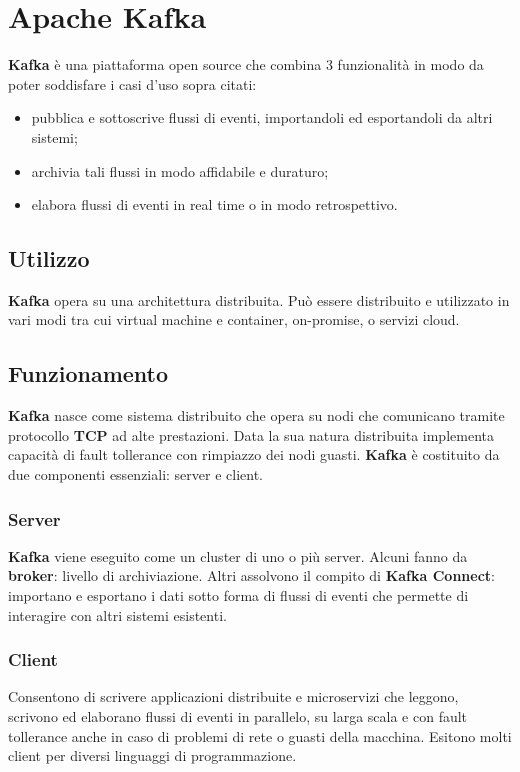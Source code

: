 \documentclass{article}
\begin{document}
\section{Apache \textbf{Kafka}}
\textbf{Kafka} è una piattaforma open source che combina 3 funzionalità in modo da poter soddisfare i casi d'uso sopra citati:
\begin{itemize}
    \item pubblica e sottoscrive flussi di eventi, importandoli ed 	esportandoli da altri sistemi;
    \item archivia tali flussi in modo affidabile e duraturo;	
    \item elabora flussi di eventi in real time o in modo retrospettivo.
\end{itemize}
\subsection{Utilizzo}
\textbf{Kafka} opera su una architettura distribuita. Può essere distribuito e utilizzato in vari modi tra cui virtual machine e container, on-promise, o servizi cloud.

\subsection{Funzionamento}
\textbf{Kafka} nasce come sistema distribuito che opera su nodi che comunicano tramite protocollo \textbf{TCP} ad alte prestazioni. Data la sua natura distribuita implementa capacità di fault tollerance con rimpiazzo dei nodi guasti. 
\textbf{Kafka} è costituito da due componenti essenziali: server e client.
\subsubsection{Server}
\textbf{Kafka} viene eseguito come un cluster di uno o più server. Alcuni fanno da \textbf{broker}: livello di archiviazione. Altri assolvono il compito di \textbf{\textbf{Kafka} Connect}: importano e esportano i dati sotto forma di  flussi di eventi che permette di interagire con altri sistemi esistenti.
\subsubsection{Client}
Consentono di scrivere applicazioni distribuite e microservizi che leggono, scrivono ed elaborano flussi di eventi in parallelo, su larga scala e con fault tollerance anche in caso di problemi di rete o guasti della macchina.
Esitono molti client per diversi linguaggi di programmazione.
\end{document}
